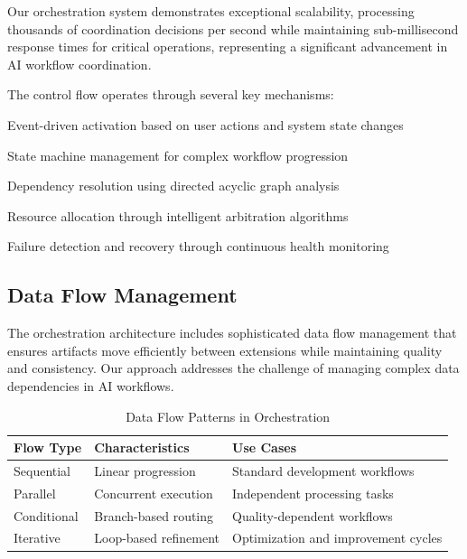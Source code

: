 \begin{successbox}
Our orchestration system demonstrates exceptional scalability, processing thousands of coordination decisions per second while maintaining sub-millisecond response times for critical operations, representing a significant advancement in AI workflow coordination.
\end{successbox}

The control flow operates through several key mechanisms:

\begin{compactlist}
    \item Event-driven activation based on user actions and system state changes
    \item State machine management for complex workflow progression
    \item Dependency resolution using directed acyclic graph analysis
    \item Resource allocation through intelligent arbitration algorithms
    \item Failure detection and recovery through continuous health monitoring
\end{compactlist}

\subsection*{Data Flow Management}

The orchestration architecture includes sophisticated data flow management that ensures artifacts move efficiently between extensions while maintaining quality and consistency. Our approach addresses the challenge of managing complex data dependencies in AI workflows.

\begin{table}[ht]
\centering
\begin{tabular}{@{}lll@{}}
\toprule
\textbf{Flow Type} & \textbf{Characteristics} & \textbf{Use Cases} \\
\midrule
Sequential & Linear progression & Standard development workflows \\
Parallel & Concurrent execution & Independent processing tasks \\
Conditional & Branch-based routing & Quality-dependent workflows \\
Iterative & Loop-based refinement & Optimization and improvement cycles \\
\bottomrule
\end{tabular}
\caption{Data Flow Patterns in Orchestration}
\end{table}

